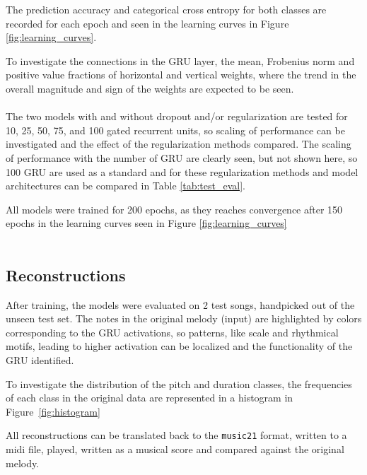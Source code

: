 The prediction accuracy and categorical cross entropy for both classes are recorded for each epoch and seen in the learning curves in Figure \ref{fig:learning_curves}.

To investigate the connections in the GRU layer, the mean, Frobenius norm and positive value fractions of horizontal and vertical weights, where the trend in the overall magnitude and sign of the weights are expected to be seen. \\ \\

The two models with and without dropout and/or regularization are tested for 10, 25, 50, 75, and 100 gated recurrent units, so scaling of performance can be investigated and the effect of the regularization methods compared. The scaling of performance with the number of GRU are clearly seen, but not shown here, so 100 GRU are used as a standard and for these regularization methods and model architectures can be compared in Table \ref{tab:test_eval}.

All models were trained for 200 epochs, as they reaches convergence after 150 epochs in the learning curves seen in Figure \ref{fig:learning_curves}\\ \\

\subsection{Reconstructions}

After training, the models were evaluated on 2 test songs, handpicked out of the unseen test set. The notes in the original melody (input) are highlighted by colors corresponding to the GRU activations, so patterns, like scale and rhythmical motifs, leading to higher activation can be localized and the functionality of the GRU identified.

To investigate the distribution of the pitch and duration classes, the frequencies of each class in the original data are represented in a histogram in Figure~\ref{fig:histogram}

All reconstructions can be translated back to the \texttt{music21} format, written to a midi file, played, written as a musical score and compared against the original melody.

